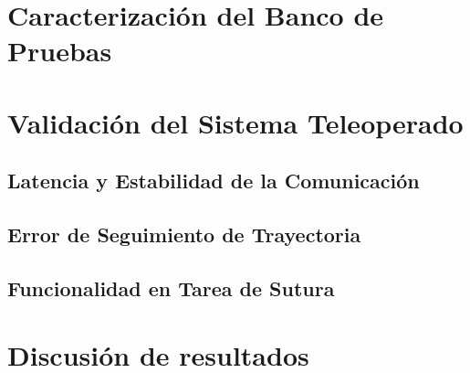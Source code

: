 \section{Caracterización del Banco de Pruebas} %

\section{Validación del Sistema Teleoperado} %


\subsection{Latencia y Estabilidad de la Comunicación} %
\subsection{Error de Seguimiento de Trayectoria} %
\subsection{Funcionalidad en Tarea de Sutura} %

\section{Discusión de resultados} %